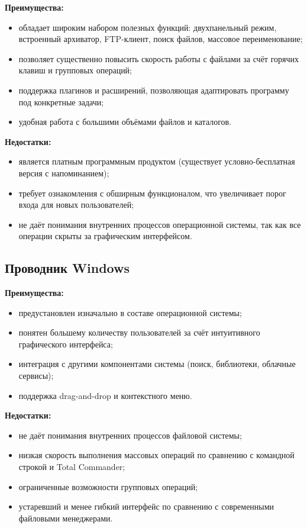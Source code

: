 \documentclass[oneside,a4paper,14pt]{extarticle}
\begin{document}
\begin{small}
	\textbf{Преимущества:}
	\begin{itemize}
		\item обладает широким набором полезных функций: двухпанельный режим, встроенный архиватор, FTP-клиент, поиск файлов, массовое переименование;
		\item позволяет существенно повысить скорость работы с файлами за счёт горячих клавиш и групповых операций;
		\item поддержка плагинов и расширений, позволяющая адаптировать программу под конкретные задачи;
		\item удобная работа с большими объёмами файлов и каталогов.
	\end{itemize}

	\textbf{Недостатки:}
	\begin{itemize}
		\item является платным программным продуктом (существует условно-бесплатная версия с напоминанием);
		\item требует ознакомления с обширным функционалом, что увеличивает порог входа для новых пользователей;
		\item не даёт понимания внутренних процессов операционной системы, так как все операции скрыты за графическим интерфейсом.
	\end{itemize}

	\subsection*{Проводник Windows}

	\textbf{Преимущества:}
	\begin{itemize}
		\item предустановлен изначально в составе операционной системы;
		\item понятен большему количеству пользователей за счёт интуитивного графического интерфейса;
		\item интеграция с другими компонентами системы (поиск, библиотеки, облачные сервисы);
		\item поддержка drag-and-drop и контекстного меню.
	\end{itemize}

	\textbf{Недостатки:}
	\begin{itemize}
		\item не даёт понимания внутренних процессов файловой системы;
		\item низкая скорость выполнения массовых операций по сравнению с командной строкой и Total Commander;
		\item ограниченные возможности групповых операций;
		\item устаревший и менее гибкий интерфейс по сравнению с современными файловыми менеджерами.
	\end{itemize}


\end{small}
\end{document}
